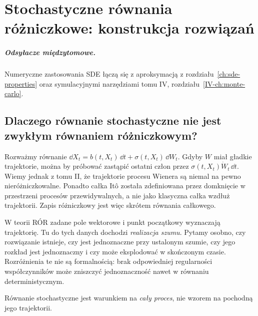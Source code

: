 \chapter{Stochastyczne równania różniczkowe: konstrukcja rozwiązań}
\label{ch:sde-existence}
\paragraph{Odsyłacze międzytomowe.} Numeryczne zastosowania SDE łączą się z aproksymacją z rozdziału~\ref{ch:sde-properties} oraz symulacyjnymi narzędziami tomu IV, rozdziału~\ref{IV-ch:monte-carlo}.


\section{Dlaczego równanie stochastyczne nie jest zwykłym równaniem różniczkowym?}
Rozważmy równanie $\dd X_t=b(t,X_t)\,\dd t+\sigma(t,X_t)\,\dd W_t$.
Gdyby $W$ miał gładkie trajektorie, można by próbować zastąpić
ostatni człon przez $\sigma(t,X_t)\dot W_t\,\dd t$.
Wiemy jednak z tomu II, że trajektorie procesu Wienera
są niemal na pewno nieróżniczkowalne. Ponadto całka Itô
została zdefiniowana przez domknięcie w przestrzeni procesów
przewidywalnych, a nie jako klasyczna całka wzdłuż trajektorii.
Zapis różniczkowy jest więc skrótem równania całkowego.

W teorii RÓR zadane pole wektorowe i punkt początkowy wyznaczają
trajektorię. Tu do tych danych dochodzi \emph{realizacja szumu}.
Pytamy osobno, czy rozwiązanie istnieje, czy jest jednoznaczne
przy ustalonym szumie, czy jego rozkład jest jednoznaczny i czy
może eksplodować w skończonym czasie. Rozróżnienia te nie są
formalnością: brak odpowiedniej regularności współczynników
może zniszczyć jednoznaczność nawet w równaniu deterministycznym.

\begin{center}
\par\smallskip\small Równanie stochastyczne jest warunkiem na \emph{cały proces}, nie wzorem na pochodną jego trajektorii.
\end{center}

